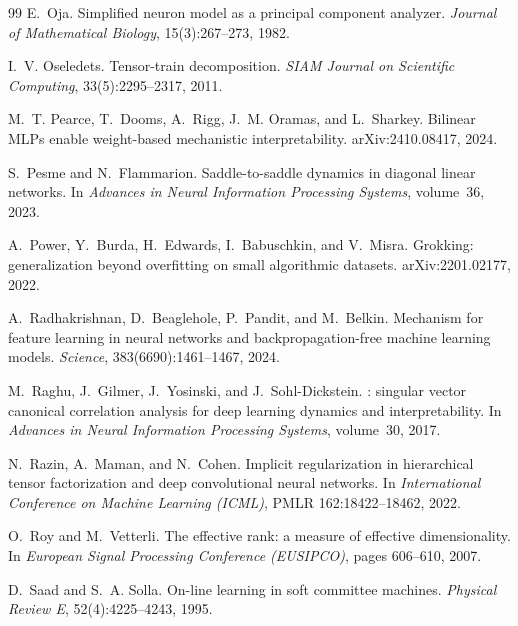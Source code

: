 \documentclass[11pt]{article}
\theoremstyle{definition}
\numberwithin{equation}{section}
\begin{document}
\begin{thebibliography}{99}
E.~Oja.
\newblock Simplified neuron model as a principal component analyzer.
\newblock \emph{Journal of Mathematical Biology}, 15(3):267--273, 1982.

I.~V. Oseledets.
\newblock Tensor-train decomposition.
\newblock \emph{SIAM Journal on Scientific Computing}, 33(5):2295--2317, 2011.

M.~T. Pearce, T.~Dooms, A.~Rigg, J.~M. Oramas, and L.~Sharkey.
\newblock Bilinear {MLPs} enable weight-based mechanistic interpretability.
\newblock arXiv:2410.08417, 2024.

S.~Pesme and N.~Flammarion.
\newblock Saddle-to-saddle dynamics in diagonal linear networks.
\newblock In \emph{Advances in Neural Information Processing Systems}, volume~36, 2023.

A.~Power, Y.~Burda, H.~Edwards, I.~Babuschkin, and V.~Misra.
\newblock Grokking: generalization beyond overfitting on small algorithmic datasets.
\newblock arXiv:2201.02177, 2022.

A.~Radhakrishnan, D.~Beaglehole, P.~Pandit, and M.~Belkin.
\newblock Mechanism for feature learning in neural networks and backpropagation-free machine learning models.
\newblock \emph{Science}, 383(6690):1461--1467, 2024.

M.~Raghu, J.~Gilmer, J.~Yosinski, and J.~Sohl-Dickstein.
: singular vector canonical correlation analysis for deep learning dynamics and interpretability.
\newblock In \emph{Advances in Neural Information Processing Systems}, volume~30, 2017.

N.~Razin, A.~Maman, and N.~Cohen.
\newblock Implicit regularization in hierarchical tensor factorization and deep convolutional neural networks.
\newblock In \emph{International Conference on Machine Learning (ICML)}, PMLR 162:18422--18462, 2022.

O.~Roy and M.~Vetterli.
\newblock The effective rank: a measure of effective dimensionality.
\newblock In \emph{European Signal Processing Conference (EUSIPCO)}, pages 606--610, 2007.

D.~Saad and S.~A. Solla.
\newblock On-line learning in soft committee machines.
\newblock \emph{Physical Review E}, 52(4):4225--4243, 1995.


\end{thebibliography}
\end{document}
